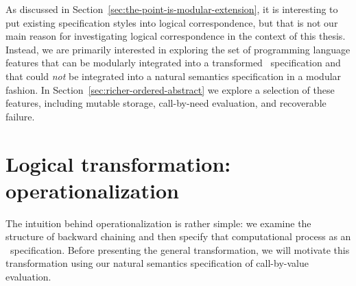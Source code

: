 As discussed in Section~\ref{sec:the-point-is-modular-extension}, it
is interesting to put existing specification styles into logical
correspondence, but that is not our main reason for investigating
logical correspondence in the context of this thesis. Instead, we are
primarily interested in exploring the set of programming language
features that can be modularly integrated into a transformed
\sls~specification and that could {\it not} be integrated into a natural
semantics specification in a modular fashion.  
In Section~\ref{sec:richer-ordered-abstract}
we explore a selection of these features, including mutable storage,
call-by-need evaluation, and recoverable failure.

\section{Logical transformation: operationalization}
\label{sec:operationalization}

The intuition behind operationalization is rather simple: we examine
the structure of backward chaining and then specify that
computational process as an \sls~specification.  Before presenting
the general transformation, we will motivate this transformation using
our natural semantics specification of call-by-value evaluation. 

